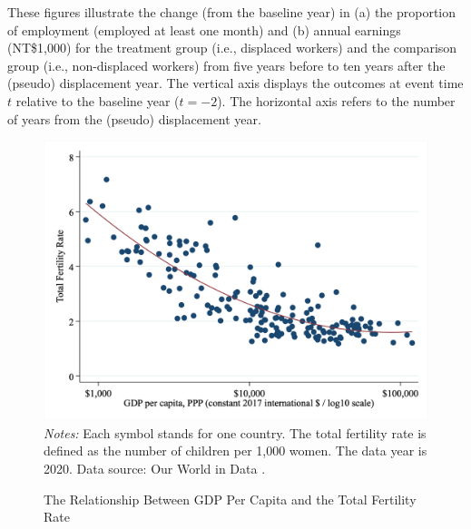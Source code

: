 \documentclass[12pt]{article}
\begin{document}
\begin{singlespace}
        \begin{footnotesize}
        		 These figures illustrate the change (from the baseline year) in (a) the proportion of employment (employed at least one month) and (b) annual earnings (NT\$1,000) for the treatment group (i.e., displaced workers) and the comparison group (i.e., non-displaced workers) from five years before to ten years after the (pseudo) displacement year. The vertical axis displays the outcomes at event time $t$ relative to the baseline year ($t = -2$). The horizontal axis refers to the number of years from the (pseudo) displacement year.
        \end{footnotesize}
\end{singlespace}



\newpage
\begin{figure}[H]
	\centering
	\caption{The Relationship Between GDP Per Capita and the Total Fertility Rate}\label{fig.gdp_fertility}
	\includegraphics[width=0.8\linewidth]{figures/FC1.jpg}\\
	\fontsize{10}{10pt}\selectfont
	\flushleft
	\emph{Notes:} Each symbol stands for one country. The total fertility rate is defined as the number of children per 1,000 women. The data year is 2020. Data source: Our World in Data \citep{owidfertilityrate,owidgdp}.
\end{figure}
\end{document}
